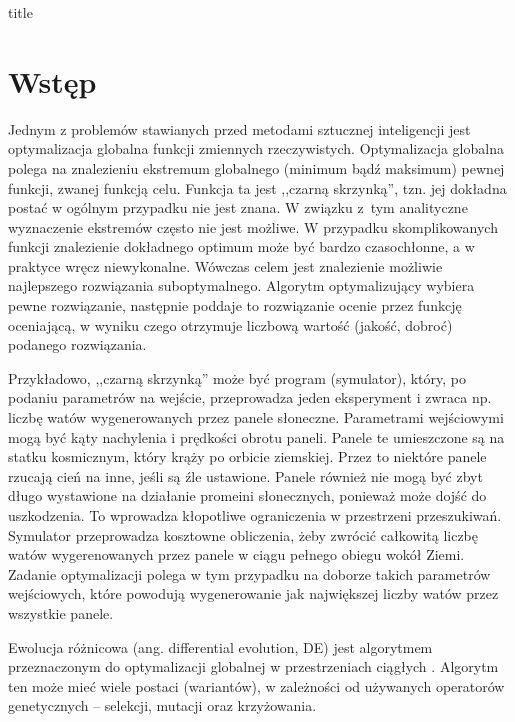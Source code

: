 \documentclass[a4paper,onecolumn,oneside,12pt,wide,floatssmall]{mwrep}
\theoremstyle{definition}
\theoremstyle{plain}%
\theoremstyle{remark}
\begin{document}
\renewcommand*\lstlistingname{Wydruk}
\renewcommand*\lstlistlistingname{Spis wydruków}

\renewcommand{\baselinestretch}{1.0}
\raggedbottom
 {title}

\tableofcontents

\newpage
{}
\setcounter{page}{1}

\chapter{Wstęp}

Jednym z problemów stawianych przed metodami sztucznej inteligencji jest optymalizacja
globalna funkcji zmiennych rzeczywistych. Optymalizacja globalna polega na znalezieniu ekstremum 
globalnego (minimum bądź maksimum) pewnej funkcji, zwanej funkcją celu. 
Funkcja ta jest ,,czarną skrzynką'', tzn. jej dokładna postać w ogólnym przypadku 
nie jest znana. W związku z~tym analityczne wyznaczenie ekstremów często nie jest możliwe. W przypadku 
skomplikowanych funkcji znalezienie dokładnego optimum może być bardzo czasochłonne, 
a w praktyce wręcz niewykonalne. Wówczas celem jest znalezienie możliwie najlepszego rozwiązania
suboptymalnego. Algorytm optymalizujący wybiera pewne rozwiązanie, następnie poddaje to rozwiązanie 
ocenie przez funkcję oceniającą, w wyniku czego otrzymuje liczbową wartość (jakość, dobroć) 
podanego rozwiązania. 

Przykładowo, ,,czarną skrzynką'' może być program (symulator), który, po podaniu 
parametrów na wejście, przeprowadza jeden eksperyment i zwraca np. liczbę watów wygenerowanych
przez panele słoneczne. Parametrami wejściowymi mogą być kąty nachylenia i prędkości obrotu paneli. 
Panele te umieszczone są na statku kosmicznym, który krąży po orbicie ziemskiej.
Przez to niektóre panele rzucają cień na inne, jeśli są źle ustawione. Panele również nie mogą być 
zbyt długo wystawione na działanie promeini słonecznych, ponieważ może dojść do uszkodzenia. 
To wprowadza kłopotliwe ograniczenia w przestrzeni przeszukiwań.
Symulator przeprowadza kosztowne obliczenia, żeby zwrócić całkowitą liczbę watów wygerenowanych
przez panele w ciągu pełnego obiegu wokół Ziemi. Zadanie optymalizacji polega w tym przypadku na
doborze takich parametrów wejściowych, które powodują wygenerowanie jak największej liczby watów
przez wszystkie panele.

Ewolucja różnicowa (ang. differential evolution, DE) jest algorytmem przeznaczonym 
do optymalizacji globalnej w przestrzeniach ciągłych \cite{storn}.
Algorytm ten może mieć wiele postaci (wariantów), w zależności od używanych
operatorów genetycznych -- selekcji, mutacji oraz krzyżowania. 
\end{document}
